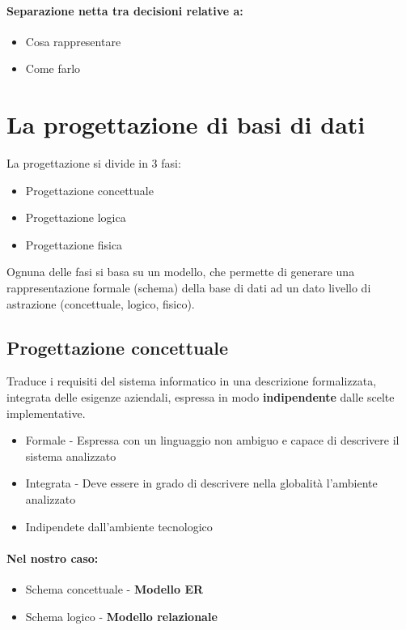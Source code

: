 \paragraph*{Separazione netta tra decisioni relative a:}
\begin{itemize}
    \item Cosa rappresentare 
    \item Come farlo
\end{itemize}
\section{La progettazione di basi di dati}
La progettazione si divide in 3 fasi:
\begin{itemize}
    \item Progettazione concettuale
    \item Progettazione logica
    \item Progettazione fisica
\end{itemize}
Ognuna delle fasi si basa su un modello, che permette di generare una rappresentazione
formale (schema) della base di dati ad un dato livello di astrazione (concettuale, logico, fisico).
\subsection{Progettazione concettuale}
Traduce i requisiti del sistema informatico in una descrizione formalizzata, integrata
delle esigenze aziendali, espressa in modo \textbf{indipendente} dalle scelte implementative.

\begin{itemize}
    \item Formale - Espressa con un linguaggio non ambiguo e capace di descrivere
    il sistema analizzato
    \item Integrata - Deve essere in grado di descrivere nella globalità l'ambiente analizzato
    \item Indipendete dall'ambiente tecnologico
\end{itemize}
\paragraph*{Nel nostro caso:}
\begin{itemize}
    \item Schema concettuale - \textbf{Modello ER}
    \item Schema logico - \textbf{Modello relazionale}
\end{itemize}
